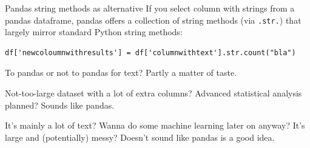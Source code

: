 \documentclass[compress]{beamer}
\begin{document}
\begin{frame}[fragile]{Pandas string methods as alternative}
If you select column with strings from a pandas dataframe, pandas offers a collection of string methods (via \texttt{.str.}) that largely mirror standard Python string methods:

\begin{lstlisting}
df['newcoloumnwithresults'] = df['columnwithtext'].str.count("bla")
\end{lstlisting} 


\pause

\begin{alertblock}{To pandas or not to pandas for text?}
Partly a matter of taste. 

Not-too-large dataset with a lot of extra columns? Advanced statistical analysis planned? Sounds like pandas.

It's mainly a lot of text? Wanna do some machine learning later on anyway? It's large and (potentially) messy? Doesn't sound like pandas is a good idea.
\end{alertblock}

\end{frame}



\end{document}
